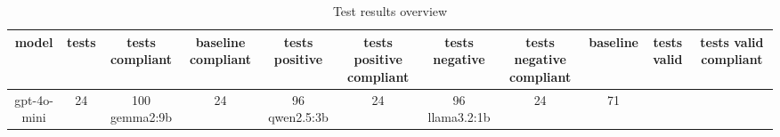 
  \begin{table}[h!]
  \centering
  \begin{tabular}{|c|c|c|c|c|c|c|c|c|c|c|}
  \hline
  model & tests & tests compliant & baseline compliant & tests positive & tests positive compliant & tests negative & tests negative compliant & baseline & tests valid & tests valid compliant \\
  \hline
  gpt-4o-mini & 24 & 100%
\hline
gemma2:9b & 24 & 96%
\hline
qwen2.5:3b & 24 & 96%
\hline
llama3.2:1b & 24 & 71%
  \end{tabular}
  \caption{Test results overview}
  
  \end{table}
  